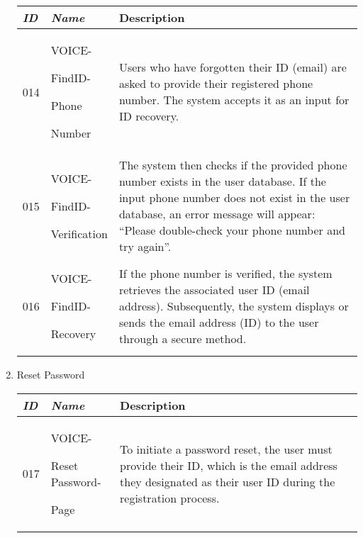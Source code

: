 \documentclass[conference]{IEEEtran}
\begin{document}
\begin{enumerate}[label=\arabic*]
    \vspace{2em}

    \begin{table}[h]
    \def\arraystretch{1.2} \small
        \begin{tabular}{|p{1cm}|p{1.8cm}|p{4.8cm}|}
        \hline
            \textit{\textbf{ID}} & \textit{\textbf{Name}} & {\textbf{Description}} \\
        \hline 
            014 \par & VOICE-\par FindID-\par Phone\par Number & Users who have forgotten their ID (email) are asked to provide their registered phone number. The system accepts it as an input for ID recovery. \\
        \hline
            015 \par & VOICE-\par FindID-\par Verification & The system then checks if the provided phone number exists in the user database. If the input phone number does not exist in the user database, an error message will appear: “Please double-check your phone number and try again”. \\
        \hline
            016 \par & VOICE-\par FindID-\par Recovery & If the phone number is verified, the system retrieves the associated user ID (email address). Subsequently, the system displays or sends the email address (ID) to the user through a secure method. \\
        \hline
        \end{tabular}
    \end{table}

    \vspace{2em}
    
    \item Reset Password\par
    \vspace{0.3em}

    \begin{table}[h]
    \def\arraystretch{1.2} \small
        \begin{tabular}{|p{1cm}|p{1.8cm}|p{4.8cm}|}
        \hline
            \textit{\textbf{ID}} & \textit{\textbf{Name}} & {\textbf{Description}} \\
        \hline
            017 \par & VOICE-\par Reset Password-\par Page & To initiate a password reset, the user must provide their ID, which is the email address they designated as their user ID during the registration process. \\
        \hline
        \end{tabular}
    \end{table}


\end{enumerate}
\end{document}
